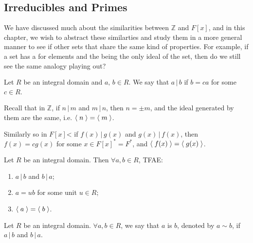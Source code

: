 \subsection{Irreducibles and Primes}%
\label{sub:irreducibles_and_primes}

We have discussed much about the similarities between $\mathbb{Z}$ and $F[x]$, and in this chapter, we wish to abstract these similarties and study them in a more general manner to see if other sets that share the same kind of properties. For example, if a set has a  for elements and the  being the only ideal of the set, then do we still see the same analogy playing out?

\begin{defn}[Division]
\label{defn:division}
  Let $R$ be an integral domain and $a, \, b \in R$. We say that $a \, | \, b$ if $b = ca$ for some $c \in R$.
\end{defn}

\begin{note}
  Recall that in $\mathbb{Z}$, if $n \, | \, m$ and $m \, | \, n$, then $n = \pm m$, and the ideal generated by them are the same, i.e. $\langle \; n \; \rangle = \langle \; m \; \rangle$.

  Similarly so in $F[x]$< if $f(x) \, | \, g(x)$ and $g(x) \, | \, f(x)$, then $f(x) = cg(x)$ for some $x \in F[x]^* = F^*$, and $\langle \; f(x) \; \rangle = \langle \; g(x) \; \rangle$.
\end{note}

\begin{propo}
\label{propo:division_in_an_integral_domain}
Let $R$ be an integral domain. Then $\forall a, b \in R$, TFAE:
  \begin{enumerate}
    \item $a \, | \, b$ and $b \, | \, a$;
    \item $a = ub$ for some unit $u \in R$;
    \item $\langle \; a \; \rangle = \langle \; b \; \rangle$.
  \end{enumerate}
\end{propo}

\begin{defn}[Association]
\label{defn:association}
  Let $R$ be an integral domain. $\forall a, b \in R$, we say that $a$ is  $b$, denoted by $a \sim b$, if $a \, | \, b$ and $b \, | \, a$.
\end{defn}

